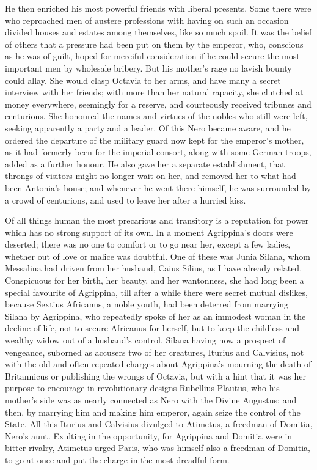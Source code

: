 
He then enriched his most powerful friends with liberal presents. Some there were who reproached men of austere professions with having on such an occasion divided houses and estates among themselves, like so much spoil. It was the belief of others that a pressure had been put on them by the emperor, who, conscious as he was of guilt, hoped for merciful consideration if he could secure the most important men by wholesale bribery. But his mother's rage no lavish bounty could allay. She would clasp Octavia to her arms, and have many a secret interview with her friends; with more than her natural rapacity, she clutched at money everywhere, seemingly for a reserve, and courteously received tribunes and centurions. She honoured the names and virtues of the nobles who still were left, seeking apparently a party and a leader. Of this Nero became aware, and he ordered the departure of the military guard now kept for the emperor's mother, as it had formerly been for the imperial consort, along with some German troops, added as a further honour. He also gave her a separate establishment, that throngs of visitors might no longer wait on her, and removed her to what had been Antonia's house; and whenever he went there himself, he was surrounded by a crowd of centurions, and used to leave her after a hurried kiss.


Of all things human the most precarious and transitory is a reputation for power which has no strong support of its own. In a moment Agrippina's doors were deserted; there was no one to comfort or to go near her, except a few ladies, whether out of love or malice was doubtful. One of these was Junia Silana, whom Messalina had driven from her husband, Caius Silius, as I have already related. Conspicuous for her birth, her beauty, and her wantonness, she had long been a special favourite of Agrippina, till after a while there were secret mutual dislikes, because Sextius Africanus, a noble youth, had been deterred from marrying Silana by Agrippina, who repeatedly spoke of her as an immodest woman in the decline of life, not to secure Africanus for herself, but to keep the childless and wealthy widow out of a husband's control. Silana having now a prospect of vengeance, suborned as accusers two of her creatures, Iturius and Calvisius, not with the old and often-repeated charges about Agrippina's mourning the death of Britannicus or publishing the wrongs of Octavia, but with a hint that it was her purpose to encourage in revolutionary designs Rubellius Plautus, who his mother's side was as nearly connected as Nero with the Divine Augustus; and then, by marrying him and making him emperor, again seize the control of the State. All this Iturius and Calvisius divulged to Atimetus, a freedman of Domitia, Nero's aunt. Exulting in the opportunity, for Agrippina and Domitia were in bitter rivalry, Atimetus urged Paris, who was himself also a freedman of Domitia, to go at once and put the charge in the most dreadful form.

